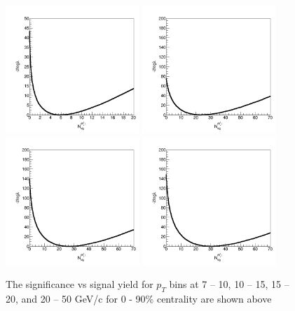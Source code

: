 \begin{figure}[h]
\begin{center}
\includegraphics[width= 0.45\textwidth]{Figures/Chapter5/sigscan_0_90_7_10.png}
\includegraphics[width= 0.45\textwidth]{Figures/Chapter5/sigscan_0_90_10_15.png}
\includegraphics[width= 0.45\textwidth]{Figures/Chapter5/sigscan_0_90_15_20.png}
\includegraphics[width= 0.45\textwidth]{Figures/Chapter5/sigscan_0_90_20_50.png}
\caption{The significance vs signal yield for $p_T$ bins at 7 -- 10, 10 -- 15, 15 -- 20, and 20 -- 50 GeV/c for 0 - 90\% centrality are shown above}
\label{BsSigScan}
\end{center}
\end{figure}


